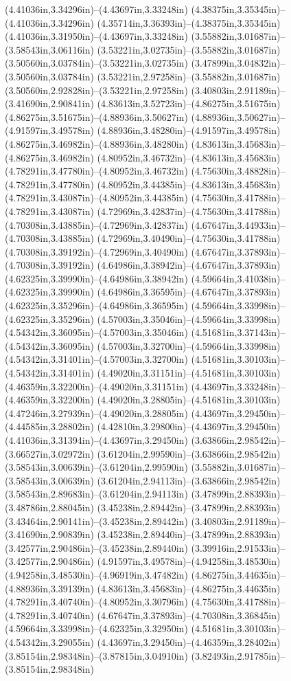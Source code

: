 (4.41036in,3.34296in)--(4.43697in,3.33248in) (4.38375in,3.35345in)--(4.41036in,3.34296in) (4.35714in,3.36393in)--(4.38375in,3.35345in) (4.41036in,3.31950in)--(4.43697in,3.33248in) (3.55882in,3.01687in)--(3.58543in,3.06116in) (3.53221in,3.02735in)--(3.55882in,3.01687in) (3.50560in,3.03784in)--(3.53221in,3.02735in) (3.47899in,3.04832in)--(3.50560in,3.03784in) (3.53221in,2.97258in)--(3.55882in,3.01687in) (3.50560in,2.92828in)--(3.53221in,2.97258in) (3.40803in,2.91189in)--(3.41690in,2.90841in) (4.83613in,3.52723in)--(4.86275in,3.51675in) (4.86275in,3.51675in)--(4.88936in,3.50627in) (4.88936in,3.50627in)--(4.91597in,3.49578in) (4.88936in,3.48280in)--(4.91597in,3.49578in) (4.86275in,3.46982in)--(4.88936in,3.48280in) (4.83613in,3.45683in)--(4.86275in,3.46982in) (4.80952in,3.46732in)--(4.83613in,3.45683in) (4.78291in,3.47780in)--(4.80952in,3.46732in) (4.75630in,3.48828in)--(4.78291in,3.47780in) (4.80952in,3.44385in)--(4.83613in,3.45683in) (4.78291in,3.43087in)--(4.80952in,3.44385in) (4.75630in,3.41788in)--(4.78291in,3.43087in) (4.72969in,3.42837in)--(4.75630in,3.41788in) (4.70308in,3.43885in)--(4.72969in,3.42837in) (4.67647in,3.44933in)--(4.70308in,3.43885in) (4.72969in,3.40490in)--(4.75630in,3.41788in) (4.70308in,3.39192in)--(4.72969in,3.40490in) (4.67647in,3.37893in)--(4.70308in,3.39192in) (4.64986in,3.38942in)--(4.67647in,3.37893in) (4.62325in,3.39990in)--(4.64986in,3.38942in) (4.59664in,3.41038in)--(4.62325in,3.39990in) (4.64986in,3.36595in)--(4.67647in,3.37893in) (4.62325in,3.35296in)--(4.64986in,3.36595in) (4.59664in,3.33998in)--(4.62325in,3.35296in) (4.57003in,3.35046in)--(4.59664in,3.33998in) (4.54342in,3.36095in)--(4.57003in,3.35046in) (4.51681in,3.37143in)--(4.54342in,3.36095in) (4.57003in,3.32700in)--(4.59664in,3.33998in) (4.54342in,3.31401in)--(4.57003in,3.32700in) (4.51681in,3.30103in)--(4.54342in,3.31401in) (4.49020in,3.31151in)--(4.51681in,3.30103in) (4.46359in,3.32200in)--(4.49020in,3.31151in) (4.43697in,3.33248in)--(4.46359in,3.32200in) (4.49020in,3.28805in)--(4.51681in,3.30103in) (4.47246in,3.27939in)--(4.49020in,3.28805in) (4.43697in,3.29450in)--(4.44585in,3.28802in) (4.42810in,3.29800in)--(4.43697in,3.29450in) (4.41036in,3.31394in)--(4.43697in,3.29450in) (3.63866in,2.98542in)--(3.66527in,3.02972in) (3.61204in,2.99590in)--(3.63866in,2.98542in) (3.58543in,3.00639in)--(3.61204in,2.99590in) (3.55882in,3.01687in)--(3.58543in,3.00639in) (3.61204in,2.94113in)--(3.63866in,2.98542in) (3.58543in,2.89683in)--(3.61204in,2.94113in) (3.47899in,2.88393in)--(3.48786in,2.88045in) (3.45238in,2.89442in)--(3.47899in,2.88393in) (3.43464in,2.90141in)--(3.45238in,2.89442in) (3.40803in,2.91189in)--(3.41690in,2.90839in) (3.45238in,2.89440in)--(3.47899in,2.88393in) (3.42577in,2.90486in)--(3.45238in,2.89440in) (3.39916in,2.91533in)--(3.42577in,2.90486in) (4.91597in,3.49578in)--(4.94258in,3.48530in) (4.94258in,3.48530in)--(4.96919in,3.47482in) (4.86275in,3.44635in)--(4.88936in,3.39139in) (4.83613in,3.45683in)--(4.86275in,3.44635in) (4.78291in,3.40740in)--(4.80952in,3.30796in) (4.75630in,3.41788in)--(4.78291in,3.40740in) (4.67647in,3.37893in)--(4.70308in,3.36845in) (4.59664in,3.33998in)--(4.62325in,3.32950in) (4.51681in,3.30103in)--(4.54342in,3.29055in) (4.43697in,3.29450in)--(4.46359in,3.28402in) (3.85154in,2.98348in)--(3.87815in,3.04910in) (3.82493in,2.91785in)--(3.85154in,2.98348in) 